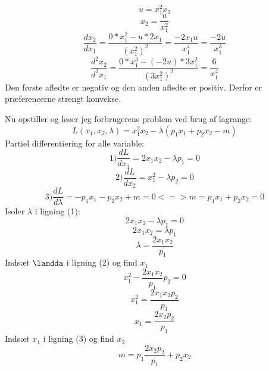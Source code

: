 \documentclass{article}
\begin{document}
\begin{equation}
    u=x_1^2x_2
\end{equation}
\begin{equation}
    x_2=\frac{u}{x_1^2}
\end{equation}
\begin{equation}
    \frac{dx_2}{dx_1}=\frac{0*x_1^2-u*2x_1}{(x_1^2)^2}=\frac{-2x_1u}{x_1^4}=\frac{-2u}{x_1^3}
\end{equation}
\begin{equation}
    \frac{d^2x_2}{d^2x_1}=\frac{0*x_1^3-(-2u)*3x_1^2}{(3x_1^2)^2}=\frac{6}{x_1^4}
\end{equation}
Den første afledte er negativ og den anden afledte er positiv. Derfor er præferencerne strengt konvekse. 

Nu opstiller og løser jeg forbrugerens problem ved brug af lagrange:
\begin{equation}
    L(x_1,x_2,\lambda)=x_1^2x_2-\lambda(p_1x_1+p_2x_2-m)
\end{equation}
Partiel differentiering for alle variable:
\begin{equation}
    1) \frac{dL}{dx_1}=2x_1x_2-\lambda p_1=0
\end{equation}
\begin{equation}
    2) \frac{dL}{dx_2}=x_1^2-\lambda p_2=0
\end{equation}
\begin{equation}
    3) \frac{dL}{d\lambda}=-p_1x_1-p_2x_2+m=0 <=> m=p_1x_1+p_2x_2=0
\end{equation}
Isoler $\lambda$ i ligning (1):
\begin{equation}
    2x_1x_2-\lambda p_1=0
\end{equation}
\begin{equation}
    2x_1x_2=\lambda p_1
\end{equation}
\begin{equation}
    \lambda = \frac{2x_1x_2}{p_1}
\end{equation}
Indsæt $\lamdda$ i ligning (2) og find $x_1$
\begin{equation}
    x_1^2-\frac{2x_1x_2}{p_1}p_2=0
\end{equation}
\begin{equation}
    x_1^2=\frac{2x_1x_2p_2}{p_1}
\end{equation}
\begin{equation}
    x_1=\frac{2x_2p_2}{p_1}
\end{equation}
Indsæt $x_1$ i ligning (3) og find $x_2$
\begin{equation}
    m=p_1\frac{2x_2p_2}{p_1}+p_2x_2
\end{equation}
\end{document}
